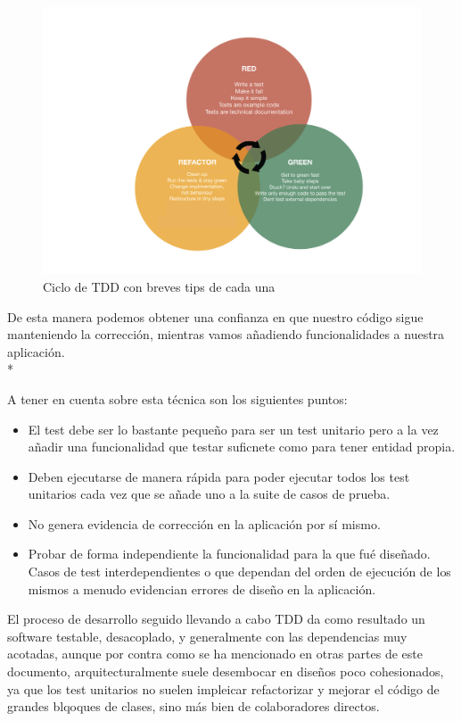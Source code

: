 \documentclass[../pfc.tex]{subfiles}
\begin{document}
		\begin{figure}[H]
			\centering
			\includegraphics[width=1\linewidth]{../images/tdd_1}
			\caption{Ciclo de TDD con breves tips de cada una}
			\label{fig:Ciclo de TDD}
		\end{figure}
	
	De esta manera podemos obtener una confianza en que nuestro código sigue manteniendo la corrección, mientras vamos añadiendo funcionalidades a nuestra aplicación.\\*
	
	A tener en cuenta sobre esta técnica son los siguientes puntos:
		\begin{itemize}
			\item El test debe ser lo bastante pequeño para ser un test unitario pero a la vez añadir una funcionalidad que testar suficnete como para tener entidad propia. 
			\item Deben ejecutarse de manera rápida para poder ejecutar todos los test unitarios cada vez que se añade uno a la suite de casos de prueba.
			\item No genera evidencia de corrección en la aplicación por sí mismo.
			\item Probar de forma independiente la funcionalidad para la que fué diseñado. Casos de test interdependientes o que dependan del orden de ejecución de los mismos a menudo evidencian errores de diseño en la aplicación.
		\end{itemize}
	
	El proceso de desarrollo seguido llevando a cabo TDD da como resultado un software testable, desacoplado, y generalmente con las dependencias muy acotadas, aunque por contra como se ha mencionado en otras partes de este documento, arquitecturalmente suele desembocar en diseños poco cohesionados, ya que los test unitarios no suelen impleicar refactorizar y mejorar el código de grandes blqoques de clases, sino más bien de colaboradores directos. 
		 
\end{document}
